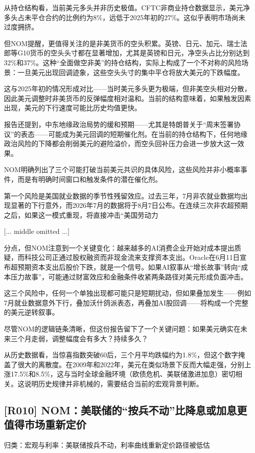 \documentclass[11pt]{ctexart}
\begin{document}
从持仓结构看，当前美元多头并非历史极值。CFTC非商业持仓数据显示，美元净多头占未平仓合约的比例约为8\%，远低于2025年初的27\%。这似乎表明市场尚未过度拥挤。

但NOM提醒，更值得关注的是非美货币的空头积累。英镑、日元、加元、瑞士法郎等G10货币的空头头寸都在显著增加，尤其是英镑和日元，净空头占比分别达到32\%和37\%。这种“全面做空非美”的持仓结构，实际上构成了一个不对称的风险场景：一旦美元出现回调迹象，这些空头头寸的集中平仓将放大美元的下跌幅度。

这与2025年初的情况形成对比——当时美元多头更为极端，但非美空头相对分散，因此美元调整时非美货币的反弹幅度相对温和。当前的结构意味着，如果触发因素出现，美元的下行速度可能比历史均值更快。

报告还提到，中东地缘政治局势的缓和预期——尤其是特朗普关于“周末签署协议”的表态——可能成为美元回调的短期催化剂。在当前的持仓结构下，任何地缘政治风险的下降都会削弱美元的避险溢价，而空头回补压力会进一步放大这一效果。

NOM明确列出了三个可能打破当前美元共识的具体风险，这些风险并非小概率事件，而是有明确时间窗口和触发条件的潜在催化剂。

第一个风险是美国就业数据的季节性残留效应。过去三年，7月非农就业数据均出现显著的下行意外，而2026年7月的数据将于8月7日公布。在连续三次非农超预期之后，如果这一模式重现，将直接冲击“美国劳动力

[... middle omitted ...]

分点，但NOM注意到一个关键变化：越来越多的AI消费企业开始对成本提出质疑，而科技公司正通过股权融资而非现金流来支撑资本支出。Oracle在6月11日宣布超预期资本支出后股价下跌，就是一个信号。如果AI叙事从“增长故事”转向“成本压力故事”，可能通过财富效应和金融条件收紧两条路径对美元形成负面冲击。

这三个风险中，任何一个单独出现都可能只是短期扰动，但如果叠加发生——例如7月就业数据意外下行，叠加沃什鸽派表态，再叠加AI股回调——将构成一个完整的美元逆转叙事。

尽管NOM的逻辑链条清晰，但这份报告留下了一个关键问题：如果美元确实在未来三个月走弱，调整幅度会有多大？持续多久？

从历史数据看，当惊喜指数突破60后，三个月平均跌幅约为1.8\%，但这个数字掩盖了很大的离散度。在2009年和2022年，美元在类似场景下反而大幅走强，分别上涨17.5\%和8.5\%，这与当时全球金融环境（欧债危机、美联储激进加息）密切相关。这说明历史规律并非机械的，需要结合当前的宏观背景判断。

\subsection{[R010] NOM：美联储的“按兵不动”比降息或加息更值得市场重新定价}
{\small\color{refgray}归类：宏观与利率：美联储按兵不动，利率曲线重新定价路径被低估}
\end{document}
